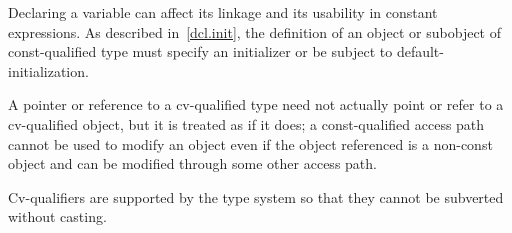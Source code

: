 \pnum
\begin{note}
Declaring a variable  can affect its linkage
and its usability in constant expressions. As
described in~\ref{dcl.init}, the definition of an object or subobject
of const-qualified type must specify an initializer or be subject to
default-initialization.
\end{note}

\pnum
A pointer or reference to a cv-qualified type need not actually point or
refer to a cv-qualified object, but it is treated as if it does; a
const-qualified access path cannot be used to modify an object even if
the object referenced is a non-const object and can be modified through
some other access path.
\begin{note}
Cv-qualifiers are supported by the type system so that they cannot be
subverted without casting.
\end{note}

